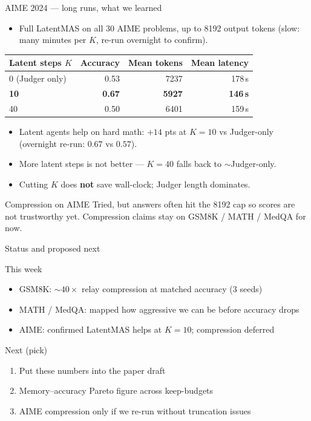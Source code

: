 \documentclass[aspectratio=169]{beamer}
\begin{document}
\begin{frame}{AIME 2024 --- long runs, what we learned}
\begin{itemize}
  \item Full LatentMAS on all 30 AIME problems, up to 8192 output tokens
        (slow: many minutes per $K$, re-run overnight to confirm).
\end{itemize}
\begin{center}
\begin{tabular}{lrrr}
\toprule
Latent steps $K$ & Accuracy & Mean tokens & Mean latency \\
\midrule
0 (Judger only) & 0.53 & 7237 & 178\,s \\
\textbf{10} & \textbf{0.67} & \textbf{5927} & \textbf{146\,s} \\
40 & 0.50 & 6401 & 159\,s \\
\bottomrule
\end{tabular}
\end{center}
\vspace{0.35em}
\begin{itemize}\small
  \item Latent agents help on hard math: $+14$ pts at $K{=}10$ vs Judger-only
        (overnight re-run: $0.67$ vs $0.57$).
  \item More latent steps is not better --- $K{=}40$ falls back to $\sim$Judger-only.
  \item Cutting $K$ does \textbf{not} save wall-clock; Judger length dominates.
\end{itemize}
\begin{block}{\small Compression on AIME}
Tried, but answers often hit the 8192 cap so scores are not trustworthy yet.
Compression claims stay on GSM8K / MATH / MedQA for now.
\end{block}
\end{frame}

\begin{frame}{Status and proposed next}
\begin{block}{This week}
\begin{itemize}\small
  \item GSM8K: $\sim\!40\times$ relay compression at matched accuracy (3 seeds)
  \item MATH / MedQA: mapped how aggressive we can be before accuracy drops
  \item AIME: confirmed LatentMAS helps at $K{=}10$; compression deferred
\end{itemize}
\end{block}
\begin{block}{Next (pick)}
\begin{enumerate}\small
  \item Put these numbers into the paper draft
  \item Memory--accuracy Pareto figure across keep-budgets
  \item AIME compression only if we re-run without truncation issues
\end{enumerate}
\end{block}
\end{frame}
\end{document}
